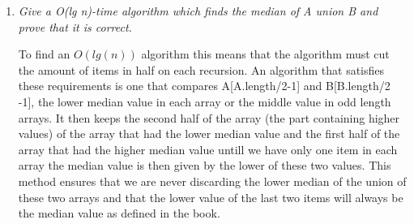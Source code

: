 \documentclass[12pt]{article}
\begin{document}
\begin{enumerate}
	\item \textit{ Give a O(lg n)-time algorithm which finds the median of A union B and prove that it is correct.}

		To find an $O(lg(n))$ algorithm this means that the algorithm must cut the amount of items in half on each recursion. An algorithm that satisfies these requirements is one that compares A[A.length/2-1] and B[B.length/2 -1], the lower median value in each array or the middle value in odd length arrays. It then keeps the second half of the array (the part containing higher values) of the array that had the lower median value and the first half of the array that had the higher median value untill we have only one item in each array the median value is then given by the lower of these two values. This method ensures that we are never discarding the lower median of the union of these two arrays and that the lower value of the last two items will always be the median value as defined in the book.
\end{enumerate}
\end{document}
